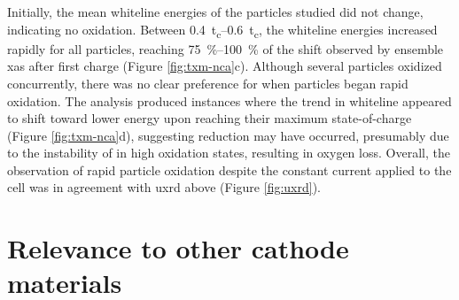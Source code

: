 \documentclass{article}
\begin{document}
Initially, the mean whiteline energies of the particles studied did
not change, indicating no  oxidation. Between
\SIrange{0.4}{0.6}{t_c}, the whiteline energies increased rapidly for
all particles, reaching \SIrange{75}{100}{\percent} of the shift
observed by ensemble \gls{xas} after first charge (Figure
\ref{fig:txm-nca}c). Although several particles oxidized concurrently,
there was no clear preference for when particles began rapid
oxidation. The analysis produced instances where the trend in
whiteline appeared to shift toward lower energy upon reaching their
maximum state-of-charge (Figure \ref{fig:txm-nca}d), suggesting
 reduction may have occurred, presumably due to the instability
of  in high oxidation states\cite{myung2020-2}, resulting in
oxygen loss. Overall, the observation of rapid particle oxidation
despite the constant current applied to the cell was in agreement with
\gls{uxrd} above (Figure \ref{fig:uxrd}).


\newpage %
\section{Relevance to other cathode materials}

\end{document}
